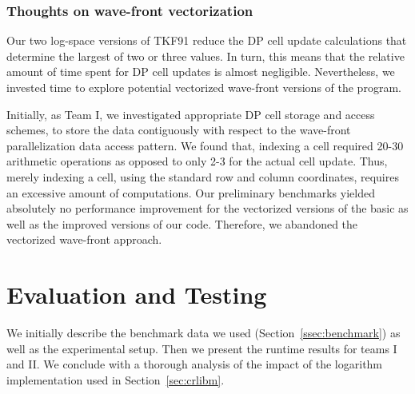 \documentclass[runningheads,a4paper]{llncs}
\begin{document}
\subsubsection{Thoughts on wave-front vectorization}


Our two log-space versions of TKF91 reduce the DP cell update calculations that determine the largest of two or three values.
In turn, this means that the relative amount of time spent for DP cell updates is almost negligible.
Nevertheless, we invested time to explore potential vectorized wave-front versions of the program.

Initially, as Team I, we investigated appropriate DP cell storage and access schemes,
to store the data contiguously with respect to the wave-front parallelization data access pattern.
We found that, indexing a cell required 20-30 arithmetic operations as opposed to only 2-3 for the actual cell update.
Thus, merely indexing a cell, using the standard row and column coordinates, requires an excessive amount of computations.
Our preliminary benchmarks yielded absolutely no performance improvement for the vectorized versions of
the basic as well as the improved versions of our code.
Therefore, we abandoned the vectorized wave-front approach.


\section{Evaluation and Testing}
\label{sec:evaluation}

We initially describe the benchmark data we used (Section~\ref{ssec:benchmark}) as well as the experimental setup.
Then we present the runtime results for teams I and II. We conclude with a thorough analysis of the impact of the logarithm implementation used
in Section~\ref{sec:crlibm}.
\end{document}

